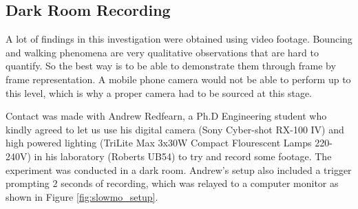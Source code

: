 \subsection{Dark Room Recording}
A lot of findings in this investigation were obtained using video footage. Bouncing and walking phenomena are very qualitative observations that are hard to quantify. So the best way is to be able to demonstrate them through frame by frame representation. A mobile phone camera would not be able to perform up to this level, which is why a proper camera had to be sourced at this stage.

Contact was made with Andrew Redfearn, a Ph.D Engineering student who kindly agreed to let us use his digital camera (Sony Cyber-shot RX-100 IV) and high powered lighting (TriLite Max 3x30W Compact Flourescent Lamps 220-240V) in his laboratory (Roberts UB54) to try and record some footage. The experiment was conducted in a dark room. Andrew's setup also included a trigger prompting 2 seconds of recording, which was relayed to a computer monitor as shown in Figure \ref{fig:slowmo_setup}.

